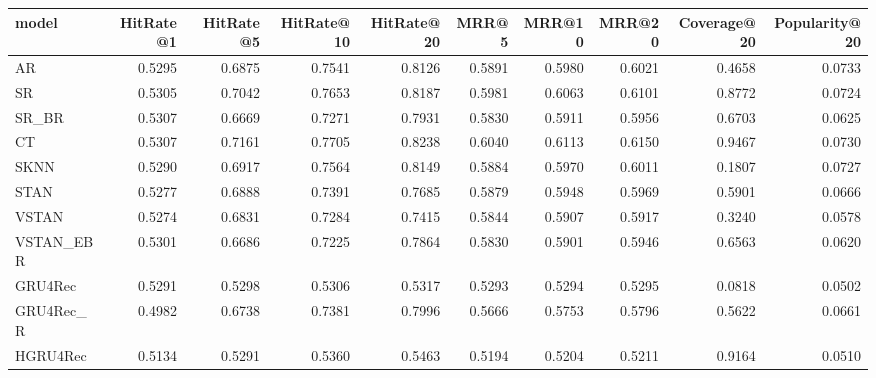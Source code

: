 \begin{tabular}{lrrrrrrrrr}
\toprule
     model &  HitRate@1 &  HitRate@5 &  HitRate@10 &  HitRate@20 &   MRR@5 &  MRR@10 &  MRR@20 &  Coverage@20 &  Popularity@20 \\
\midrule
        AR &     0.5295 &     0.6875 &      0.7541 &      0.8126 &  0.5891 &  0.5980 &  0.6021 &       0.4658 &         0.0733 \\
        SR &     0.5305 &     0.7042 &      0.7653 &      0.8187 &  0.5981 &  0.6063 &  0.6101 &       0.8772 &         0.0724 \\
     SR\_BR &     0.5307 &     0.6669 &      0.7271 &      0.7931 &  0.5830 &  0.5911 &  0.5956 &       0.6703 &         0.0625 \\
        CT &     0.5307 &     0.7161 &      0.7705 &      0.8238 &  0.6040 &  0.6113 &  0.6150 &       0.9467 &         0.0730 \\
      SKNN &     0.5290 &     0.6917 &      0.7564 &      0.8149 &  0.5884 &  0.5970 &  0.6011 &       0.1807 &         0.0727 \\
      STAN &     0.5277 &     0.6888 &      0.7391 &      0.7685 &  0.5879 &  0.5948 &  0.5969 &       0.5901 &         0.0666 \\
     VSTAN &     0.5274 &     0.6831 &      0.7284 &      0.7415 &  0.5844 &  0.5907 &  0.5917 &       0.3240 &         0.0578 \\
 VSTAN\_EBR &     0.5301 &     0.6686 &      0.7225 &      0.7864 &  0.5830 &  0.5901 &  0.5946 &       0.6563 &         0.0620 \\
   GRU4Rec &     0.5291 &     0.5298 &      0.5306 &      0.5317 &  0.5293 &  0.5294 &  0.5295 &       0.0818 &         0.0502 \\
 GRU4Rec\_R &     0.4982 &     0.6738 &      0.7381 &      0.7996 &  0.5666 &  0.5753 &  0.5796 &       0.5622 &         0.0661 \\
  HGRU4Rec &     0.5134 &     0.5291 &      0.5360 &      0.5463 &  0.5194 &  0.5204 &  0.5211 &       0.9164 &         0.0510 \\
\bottomrule
\end{tabular}

